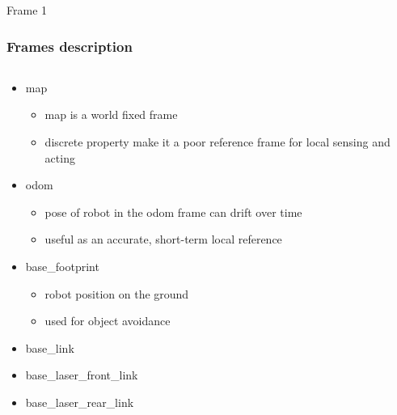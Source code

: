 
\begin{frame}{Frame 1}
\frametitle {Frames description}
 
 \begin{columns}
 \begin{column}{0.8\textwidth}
		\begin{itemize}
		\item map
 			 \begin{itemize}
  				\item map is a world fixed frame
 				 \item discrete property make it a poor reference frame for local sensing and acting
  			\end{itemize}
		\item odom
		\begin{itemize}
			\item  pose of robot in the odom frame can drift over time
			\item  useful as an accurate, short-term local reference
		\end{itemize}
	\item base\_footprint
		\begin{itemize}
		\item robot position on the ground
		\item used for object avoidance
		\end{itemize}
	\item base\_link
	\item base\_laser\_front\_link
	\item base\_laser\_rear\_link
	\end{itemize}
\end{column} 
 


\end{columns}
\end{frame}
